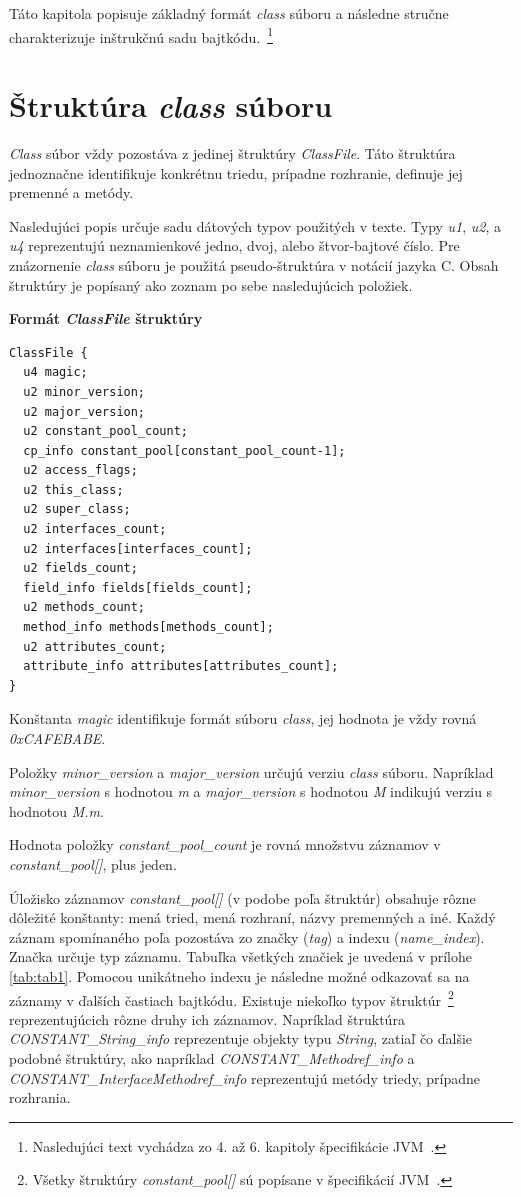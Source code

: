 \documentclass[11pt,final,oneside]{fithesis}
\newenvironment{example}[1]
{
\vspace{3mm}
\noindent\textbf{#1}
\vspace{2mm}
}
{
\vspace{3mm}
}
\begin{document}
Táto kapitola popisuje základný formát \textit{class} súboru a následne stručne
charakterizuje inštrukčnú sadu bajtkódu.~\footnote{Nasledujúci text vychádza 
zo 4. až 6. kapitoly špecifikácie JVM~\cite{Lindholm:2013:JVM:2462629}.}

\section{Štruktúra \textit{class} súboru}
\label{sec:classFile}
\textit{Class} súbor vždy pozostáva z jedinej štruktúry \textit{ClassFile}.
Táto štruktúra jednoznačne identifikuje konkrétnu triedu, 
prípadne rozhranie, definuje jej premenné a metódy.

Nasledujúci popis určuje sadu dátových typov použitých v texte. Typy
\textit{u1}, \textit{u2}, a \textit{u4} reprezentujú neznamienkové jedno, 
dvoj, alebo štvor-bajtové číslo. Pre znázornenie \textit{class} súboru je 
použitá pseudo-štruktúra v notácií jazyka C. Obsah štruktúry je popísaný ako 
zoznam po sebe nasledujúcich položiek.

\begin{example}{Formát \textit{ClassFile} štruktúry}
\begin{verbatim}
ClassFile {
  u4 magic;
  u2 minor_version;
  u2 major_version;
  u2 constant_pool_count;
  cp_info constant_pool[constant_pool_count-1];
  u2 access_flags;
  u2 this_class;
  u2 super_class;
  u2 interfaces_count;
  u2 interfaces[interfaces_count];
  u2 fields_count;
  field_info fields[fields_count];
  u2 methods_count;
  method_info methods[methods_count];
  u2 attributes_count;
  attribute_info attributes[attributes_count];
}
\end{verbatim}
\end{example}

Konštanta \textit{magic} identifikuje formát súboru \textit{class},
jej hodnota je vždy rovná \textit{0xCAFEBABE}.

Položky \textit{minor\_version} a \textit{major\_version}
určujú verziu \textit{class} súboru. Napríklad \textit{minor\_version} s
hodnotou \textit{m} a \textit{major\_version} s hodnotou \textit{M} indikujú
verziu s hodnotou \textit{M.m}.

Hodnota položky \textit{constant\_pool\_count} je rovná množstvu záznamov
v \textit{constant\_pool[]}, plus jeden.

Úložisko záznamov \textit{constant\_pool[]} (v podobe poľa štruktúr)
obsahuje rôzne dôležité konštanty: mená tried,  mená rozhraní, názvy 
premenných a iné. Každý záznam spomínaného poľa pozostáva zo značky
(\textit{tag}) a indexu (\textit{name\_index}). Značka určuje typ záznamu. 
Tabuľka všetkých značiek je uvedená v prílohe \ref{tab:tab1}. Pomocou 
unikátneho indexu je následne možné odkazovať sa na záznamy v ďalších častiach 
bajtkódu. Existuje niekoľko typov štruktúr~\footnote{Všetky štruktúry \textit{
constant\_pool[]} sú popísane v špecifikácií
JVM~\cite{Lindholm:2013:JVM:2462629}.}
reprezentujúcich rôzne druhy ich záznamov. Napríklad štruktúra
\textit{CONSTANT\_String\_info} reprezentuje objekty typu \textit{String}, 
zatiaľ čo ďalšie podobné štruktúry, ako napríklad
\textit{CONSTANT\_Methodref\_info} a 
\textit{CONSTANT\_InterfaceMethodref\_info} reprezentujú metódy 
triedy, prípadne rozhrania.
\end{document}
